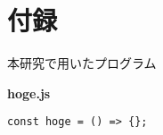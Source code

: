 \chapter*{付録}
\thispagestyle{fancy}

本研究で用いたプログラム

{\bf hoge.js}

\begin{lstlisting}
const hoge = () => {};
\end{lstlisting}
